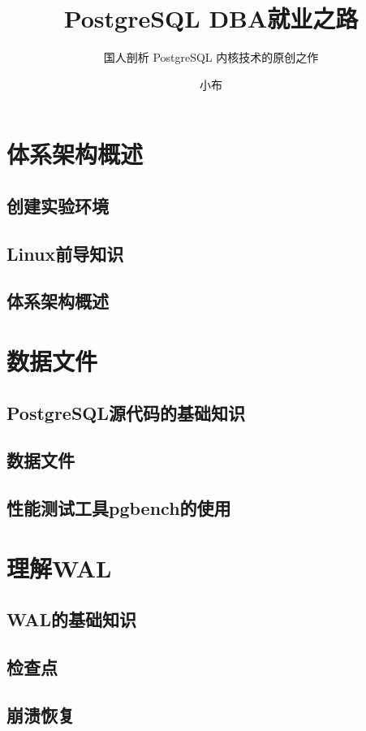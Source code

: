 \documentclass[lang=cn,newtx,10pt,scheme=chinese]{elegantbook}
\title{PostgreSQL DBA就业之路}
\subtitle{国人剖析 PostgreSQL 内核技术的原创之作}
\author{小布}
\begin{document}
\maketitle
\frontmatter

\tableofcontents

\mainmatter

\chapter{体系架构概述}
\section{创建实验环境}
\section{Linux前导知识}
\section{体系架构概述}

\chapter{数据文件}
\section{PostgreSQL源代码的基础知识}
\section{数据文件}
\section{性能测试工具pgbench的使用}

\chapter{理解WAL}
\section{WAL的基础知识}
\section{检查点}
\section{崩溃恢复}
\end{document}
